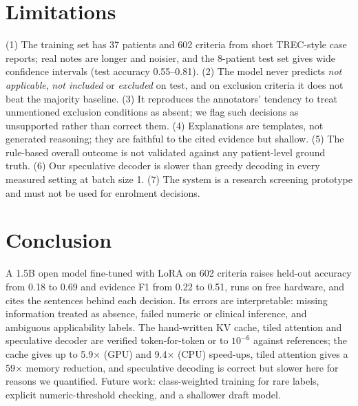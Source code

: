 \documentclass[conference]{IEEEtran}
\begin{document}
\section{Limitations}
(1) The training set has 37 patients and 602 criteria from short TREC-style case reports; real notes are longer and noisier, and the 8-patient test set gives wide confidence intervals (test accuracy 0.55--0.81). (2) The model never predicts \emph{not applicable}, \emph{not included} or \emph{excluded} on test, and on exclusion criteria it does not beat the majority baseline. (3) It reproduces the annotators' tendency to treat unmentioned exclusion conditions as absent; we flag such decisions as unsupported rather than correct them. (4) Explanations are templates, not generated reasoning; they are faithful to the cited evidence but shallow. (5) The rule-based overall outcome is not validated against any patient-level ground truth. (6) Our speculative decoder is slower than greedy decoding in every measured setting at batch size 1. (7) The system is a research screening prototype and must not be used for enrolment decisions.

\section{Conclusion}
A 1.5B open model fine-tuned with LoRA on 602 criteria raises held-out accuracy from 0.18 to 0.69 and evidence F1 from 0.22 to 0.51, runs on free hardware, and cites the sentences behind each decision. Its errors are interpretable: missing information treated as absence, failed numeric or clinical inference, and ambiguous applicability labels. The hand-written KV cache, tiled attention and speculative decoder are verified token-for-token or to $10^{-6}$ against references; the cache gives up to 5.9$\times$ (GPU) and 9.4$\times$ (CPU) speed-ups, tiled attention gives a 59$\times$ memory reduction, and speculative decoding is correct but slower here for reasons we quantified. Future work: class-weighted training for rare labels, explicit numeric-threshold checking, and a shallower draft model.

\appendices
\end{document}
